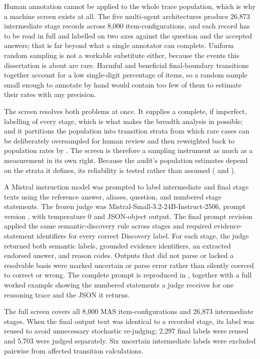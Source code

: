 Human annotation cannot be applied to the whole trace population, which is why a machine screen exists at all. The five multi-agent architectures produce 26,873 intermediate stage records across 8,000 item-configurations, and each record has to be read in full and labelled on two axes against the question and the accepted answers; that is far beyond what a single annotator can complete. Uniform random sampling is not a workable substitute either, because the events this dissertation is about are rare. Harmful and beneficial final-boundary transitions together account for a low single-digit percentage of items, so a random sample small enough to annotate by hand would contain too few of them to estimate their rates with any precision.

The screen resolves both problems at once. It supplies a complete, if imperfect, labelling of every stage, which is what makes the breadth analysis in  possible; and it partitions the population into transition strata from which rare cases can be deliberately oversampled for human review and then reweighted back to population rates by . The screen is therefore a sampling instrument as much as a measurement in its own right. Because the audit's population estimates depend on the strata it defines, its reliability is tested rather than assumed ( and ).

A Mistral instruction model was prompted to label intermediate and final stage texts using the reference answer, aliases, question, and numbered stage statements. The frozen judge was Mistral-Small-3.2-24B-Instruct-2506, prompt version , with temperature 0 and JSON-object output. The final prompt revision applied the same semantic-discovery rule across stages and required evidence-statement identifiers for every correct Discovery label. For each stage, the judge returned both semantic labels, grounded evidence identifiers, an extracted endorsed answer, and reason codes. Outputs that did not parse or lacked a resolvable basis were marked uncertain or parse error rather than silently coerced to correct or wrong. The complete prompt is reproduced in , together with a full worked example showing the numbered statements a judge receives for one reasoning trace and the JSON it returns.

The full screen covers all 8,000 MAS item-configurations and 26,873 intermediate stages. When the final output text was identical to a recorded stage, its label was reused to avoid unnecessary stochastic re-judging; 2,297 final labels were reused and 5,703 were judged separately. Six uncertain intermediate labels were excluded pairwise from affected transition calculations.

